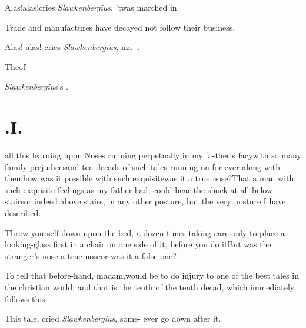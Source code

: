 \documentclass[twoside]{article}
\begin{document}
Alas!\@ alas!\@ cries \textit{Slawkenbergius}, ’twas\break
{} 
marched in.

Trade and manufactures have decayed\break 
{} 
not follow their business.

Alas! alas! cries \textit{Slawkenbergius}, ma-\break
{} 
.

\bigskip
\centerline{The\enspace {}\enspace of}
\centerline{\textit{Slawkenbergius}’s .}

\bigskip

\newpage\null
\section{.\enspace I.}

 all this learning upon Noses
running perpetually in my fa-\break ther’s facy\sic\tsk with so
many family prejudices\tsk and ten decads of such tales
running on for ever along with them\tsk how was it possible
with such exquisite\tsk was it a true nose?\tsk That a man
with such exquisite feelings as my father had, could bear
the shock at all below stairs\tsk or indeed above stairs, in
any other posture, but the very posture I have described.

\tsk Throw yourself down upon the bed, a dozen times\tsk
taking care only to place a looking-glass first in a chair
on one side of it, before you do it\tsh But was the
stranger’s nose a true nose\tsk or was it a false one?

To tell that before-hand, madam,\break would be to do injury to one of
the best tales in the christian world; and that is the tenth of the
tenth decad, which immediately follows this.

This tale, cried \textit{Slawkenbergius}, some-\break
{} 
ever go down after it.
\end{document}
